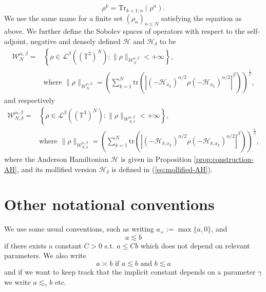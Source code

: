 \[ \rho^k = \mathrm{Tr}_{k + 1 : n} (\rho^n) . \]
We use the same name for a finite set $(\rho_n)_{n \leqslant N}$ satisfying
the equation as above. We further define the Sobolev spaces of operators with
respect to the self-adjoint, negative and densely defined $\mathcal{H}$ and
$\mathcal{H}_{\delta}$ to be
\begin{equation}
\begin{split}
  \mathcal{W}_N^{\alpha, \beta} = & \left\{ \rho \in \mathcal{L}^{\beta}
  ((\mathbb{T}^3)^N) : \| \rho \|_{\mathcal{W}^{\alpha, \beta}_N} < + \infty
  \right\}, \\
  & \text{where } {\| \rho \|_{\mathcal{W}_N^{\alpha, \beta}}}  = \left( \sum_{k
  = 1}^N \mathrm{tr} (| (- \mathcal{H}_{x_k})^{\alpha / 2} \rho (-
  \mathcal{H}_{x_k})^{\alpha / 2} |^{\beta}) \right)^{\frac{1}{\beta}},
  \label{operator-norm-sobolev}
  \end{split}
\end{equation}
and respectively 
\begin{equation}
\begin{split}
  \mathcal{W}_{N, \delta}^{\alpha, \beta} = & \left\{ \rho \in \mathcal{L}^{\beta}
  ((\mathbb{T}^3)^N) : \| \rho \|_{\mathcal{W}^{\alpha, \beta}_{N, \delta}} <
  + \infty \right\}, \\
  & \text{where }\| \rho \|_{\mathcal{W}_{N, \delta}^{\alpha, \beta}} =
  \left( \sum_{k = 1}^N \mathrm{tr} (| (- \mathcal{H}_{\delta, x_k})^{\alpha /
  2} \rho (- \mathcal{H}_{\delta, x_k})^{\alpha / 2} |^{\beta})
  \right)^{\frac{1}{\beta}}, \label{operator-norm-sobolev-delta}
  \end{split}
\end{equation}
where the Anderson Hamiltonian $\mathcal{H}$ is given in Proposition
\ref{prop:construction-AH}, and its mollified version $\mathcal{H}_{\delta}$
is defined in (\ref{eq:mollified-AH}).

\section*{Other notational conventions}

We use some usual conventions, such as writing $a_+ := \max \{ a, 0 \}$, and
\[ a \lesssim b \]
if there exists a constant $C > 0$ s.t. $a \leqslant C b$ which does not
depend on relevant parameters. We also write
\[ a \asymp b \text{ if } a \lesssim b \text{ and } b \lesssim a \]
and if we want to keep track that the implicit constant depends on a parameter
$\gamma$ we write $a \lesssim_{\gamma} b$ etc.

